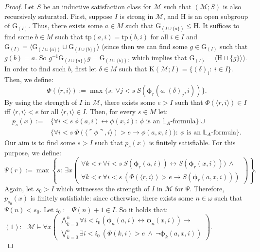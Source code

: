 \documentclass[11pt]{article}
\theoremstyle{plain}
\theoremstyle{definition}
\newcommand{\M}{\mathcal{M}}
\newcommand{\G}{\mathrm{G}}
\newcommand{\tp}{\mathrm{tp}}
\begin{document}
\begin{proof}
 Let $S$ be an inductive satisfaction class for $\M$ such that $(\M;S)$ is also recursively saturated. First, suppose $I$ is strong in $\M$, and $\mathrm{H}$ is an open subgroup  of $\G_{(I)}$. Thus, there exists some $a\in M$ such that $\G_{(I\cup\{a\})}\leq \mathrm{H}$. It suffices to find some $b\in M$ such that $\tp(a,i)=\tp(b,i)$ for all $i\in I$ and $\G_{(I)}=\langle\G_{(I\cup\{a\})}\cup\G_{(I\cup\{b\})}\rangle$ (since then we can find some  $g\in \G_{(I)}$ such that $g(b)=a$. So $g^{-1}\G_{(I\cup\{a\})}g=\G_{(I\cup\{b\})}$, which implies that  $\G_{(I)}=\langle \mathrm{H}\cup\{g\}\rangle$).\\
  In order to find such $b$, first let $\delta\in M$ such that 
$\mathrm{K}(\M;I)=\{(\delta)_{i}: \ i\in I\}$. Then, we
define:
$$\Phi( \langle r,i\rangle):=\max\{s: \ \forall j<s \  S(\bm{\phi}_{r}(a,(\delta)_{j},i))\}. $$
By using the strength of $I$ in $\M$, there exists some $e>I$ such that   $\Phi(\langle r,i\rangle)\in I$ iff $\langle r,i\rangle<e$ for all $\langle r,i\rangle\in I$. Then, for every $s\in M$ let:
\begin{align*}
p_{s}(x):=&\{\forall i<s \ \phi(a,i)\leftrightarrow\phi(x,i): \ \phi \text{ is an }\mathbb{L}_{A}\text{-formula}\}\cup\\&
\{ \forall i<s \ \Phi(\langle\ulcorner\phi\urcorner,i\rangle)>e\rightarrow   \phi(a,x,i)):\ \phi \text{ is an }\mathbb{L}_{A}\text{-formula}\}.
\end{align*}
 Our aim is to find some $s>I$ such that $p_{s}(x)$ is finitely satisfiable. For this purpose, we define:
$$\Psi(r):=\max\left\lbrace s: \ \exists x  \left(\begin{array}{c}
\forall k<r \ \forall i<s \ S(\bm{\phi}_{r}(a,i))\leftrightarrow S(\bm{\phi}_{r}(x,i)))\ \wedge \\ \forall k<r \ \forall i<s \  (\Phi(\langle r,i\rangle)>e\rightarrow S(\bm{\phi}_{r}(a,x,i)))
\end{array}\right)\right\rbrace . $$
Again, let $s_{0}>I$ which witnesses the strength of $I$ in $\M$ for $\Psi$. Therefore, $p_{s_{0}}(x)$ is finitely satisfiable: since otherwise, there exists some  $n\in\omega$ such that $\Psi(n)<s_{0}$. Let $i_{0}:=\Psi(n)+1\in I$. So it holds that:\\

$(1): \ \ \ \M\models\forall x 
  \left(\begin{array}{c} \bigwedge_{k=0}^{n} \forall i<i_{0} (\bm{\phi}_{n}(a,i)\leftrightarrow\bm{\phi}_{n}(x,i))\rightarrow \\
\bigvee_{k= 0}^{n}\exists i<i_{0} \ (\Phi(k,i)>e \ \wedge \ \neg\bm{\phi}_{k}(a,x,i))
\end{array}\right)$.\\


\end{proof}
\end{document}
